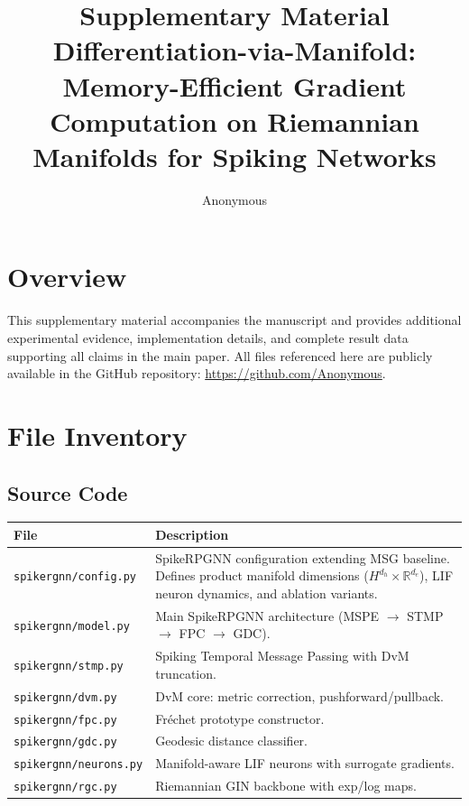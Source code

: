 \documentclass[a4paper,11pt]{article}
\title{Supplementary Material\\
\large Differentiation-via-Manifold: Memory-Efficient Gradient Computation on Riemannian Manifolds for Spiking Networks}
\author{Anonymous}
\date{}
\begin{document}
\maketitle

\section{Overview}
This supplementary material accompanies the manuscript and provides additional experimental evidence, implementation details, and complete result data supporting all claims in the main paper. All files referenced here are publicly available in the GitHub repository: \url{https://github.com/Anonymous}.

\section{File Inventory}

\subsection{Source Code}
\begin{longtable}{p{6.5cm}p{8cm}}
\toprule
\textbf{File} & \textbf{Description} \\
\midrule
\texttt{spikergnn/config.py} & SpikeRPGNN configuration extending MSG baseline. Defines product manifold dimensions ($H^{d_h}{\times}\mathbb{R}^{d_e}$), LIF neuron dynamics, and ablation variants. \\
\texttt{spikergnn/model.py} & Main SpikeRPGNN architecture (MSPE $\to$ STMP $\to$ FPC $\to$ GDC). \\
\texttt{spikergnn/stmp.py} & Spiking Temporal Message Passing with DvM truncation. \\
\texttt{spikergnn/dvm.py} & DvM core: metric correction, pushforward/pullback. \\
\texttt{spikergnn/fpc.py} & Fréchet prototype constructor. \\
\texttt{spikergnn/gdc.py} & Geodesic distance classifier. \\
\texttt{spikergnn/neurons.py} & Manifold-aware LIF neurons with surrogate gradients. \\
\texttt{spikergnn/rgc.py} & Riemannian GIN backbone with exp/log maps. \\
\bottomrule
\end{longtable}
\end{document}
